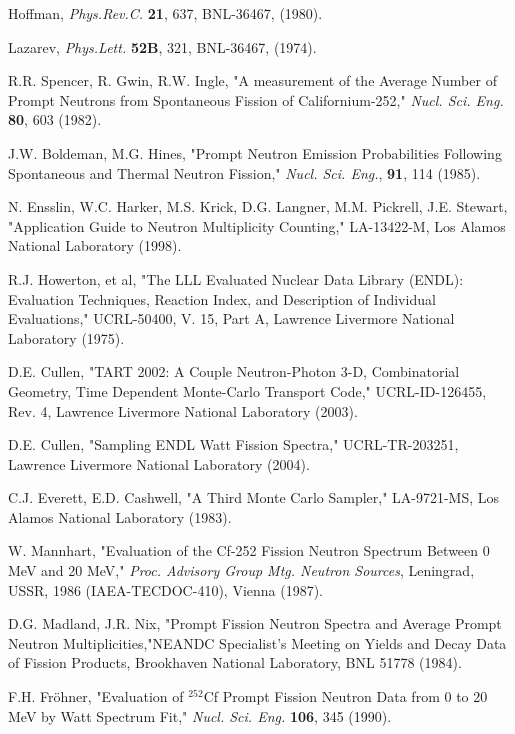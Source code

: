 Hoffman, \textit{Phys.Rev.C.} \textbf{21},
637, BNL-36467, (1980).

 Lazarev, \textit{Phys.Lett.} \textbf{52B},
321, BNL-36467, (1974).

 R.R. Spencer, R. Gwin, R.W. Ingle, "A
measurement of the Average Number of Prompt Neutrons from Spontaneous
Fission of Californium-252," \textit{Nucl. Sci. Eng.} \textbf{80}, 603
(1982).  

 J.W. Boldeman, M.G. Hines, "Prompt
Neutron Emission Probabilities Following Spontaneous and Thermal
Neutron Fission," \textit{Nucl. Sci. Eng.}, \textbf{91}, 114 (1985).

 N. Ensslin, W.C. Harker, M.S. Krick,
D.G. Langner, M.M. Pickrell, J.E. Stewart, "Application Guide to
Neutron Multiplicity Counting," LA-13422-M, Los Alamos National
Laboratory (1998).  

 R.J. Howerton, et al, "The LLL
Evaluated Nuclear Data Library (ENDL): Evaluation Techniques, Reaction
Index, and Description of Individual Evaluations," UCRL-50400, V. 15,
Part A, Lawrence Livermore National Laboratory (1975).

 D.E. Cullen, "TART 2002: A Couple
Neutron-Photon 3-D, Combinatorial Geometry, Time Dependent Monte-Carlo
Transport Code," UCRL-ID-126455, Rev. 4, Lawrence Livermore National
Laboratory (2003).  

 D.E. Cullen, "Sampling ENDL Watt Fission
Spectra," UCRL-TR-203251, Lawrence Livermore National Laboratory
(2004).  

 C.J. Everett, E.D. Cashwell, "A Third
Monte Carlo Sampler," LA-9721-MS, Los Alamos National Laboratory
(1983).  


 W. Mannhart, "Evaluation
of the Cf-252 Fission Neutron Spectrum Between 0 MeV and 20 MeV,"
\textit{Proc. Advisory Group Mtg. Neutron Sources}, Leningrad, USSR,
1986 (IAEA-TECDOC-410), Vienna (1987).  

D.G. Madland, J.R. Nix, "Prompt Fission Neutron Spectra and Average
Prompt Neutron Multiplicities,"NEANDC Specialist's Meeting on Yields
and Decay Data of Fission Products, Brookhaven National Laboratory,
BNL 51778 (1984).  

 F.H. Fr\"{o}hner,
"Evaluation of $^{252}$Cf Prompt Fission Neutron Data from 0 to 20 MeV
by Watt Spectrum Fit," \textit{Nucl. Sci. Eng.} \textbf{106}, 345
(1990).  

